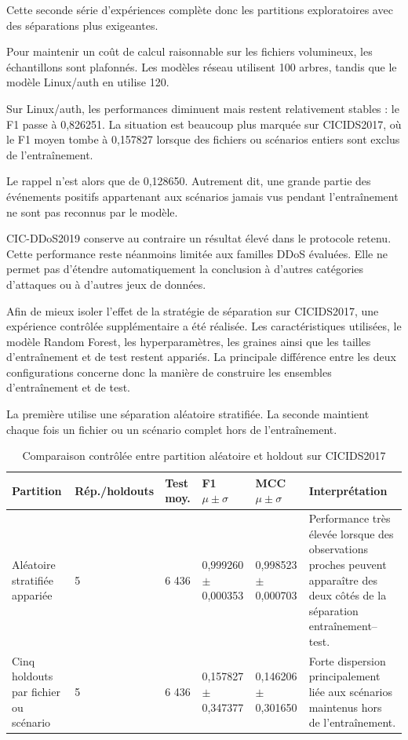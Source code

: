 Cette seconde série d'expériences complète donc les partitions exploratoires avec des séparations plus exigeantes.

Pour maintenir un coût de calcul raisonnable sur les fichiers volumineux, les échantillons sont plafonnés. Les modèles réseau utilisent 100 arbres, tandis que le modèle Linux/auth en utilise 120.

Sur Linux/auth, les performances diminuent mais restent relativement stables : le F1 passe à 0,826251. La situation est beaucoup plus marquée sur CICIDS2017, où le F1 moyen tombe à 0,157827 lorsque des fichiers ou scénarios entiers sont exclus de l'entraînement.

Le rappel n'est alors que de 0,128650. Autrement dit, une grande partie des événements positifs appartenant aux scénarios jamais vus pendant l'entraînement ne sont pas reconnus par le modèle.

CIC-DDoS2019 conserve au contraire un résultat élevé dans le protocole retenu. Cette performance reste néanmoins limitée aux familles DDoS évaluées. Elle ne permet pas d'étendre automatiquement la conclusion à d'autres catégories d'attaques ou à d'autres jeux de données.

Afin de mieux isoler l'effet de la stratégie de séparation sur CICIDS2017, une expérience contrôlée supplémentaire a été réalisée. Les caractéristiques utilisées, le modèle Random Forest, les hyperparamètres, les graines ainsi que les tailles d'entraînement et de test restent appariés. La principale différence entre les deux configurations concerne donc la manière de construire les ensembles d'entraînement et de test.

La première utilise une séparation aléatoire stratifiée. La seconde maintient chaque fois un fichier ou un scénario complet hors de l'entraînement.

\begin{table}[H]
\centering
\caption{Comparaison contrôlée entre partition aléatoire et holdout sur CICIDS2017}
\label{tab:controlled-split-cicids}
\scriptsize

\begin{tabularx}{\textwidth}{p{3.0cm}p{1.2cm}p{2.0cm}p{2.2cm}p{2.2cm}X}
\toprule
\textbf{Partition} &
\textbf{Rép./holdouts} &
\textbf{Test moy.} &
\textbf{F1 $\mu \pm \sigma$} &
\textbf{MCC $\mu \pm \sigma$} &
\textbf{Interprétation}
\tabularnewline
\midrule

Aléatoire stratifiée appariée &
5 &
6 436 &
0,999260 $\pm$ 0,000353 &
0,998523 $\pm$ 0,000703 &
Performance très élevée lorsque des observations proches peuvent apparaître des deux côtés de la séparation entraînement--test.
\tabularnewline

Cinq holdouts par fichier ou scénario &
5 &
6 436 &
0,157827 $\pm$ 0,347377 &
0,146206 $\pm$ 0,301650 &
Forte dispersion principalement liée aux scénarios maintenus hors de l'entraînement.
\tabularnewline

\bottomrule
\end{tabularx}
\end{table}

